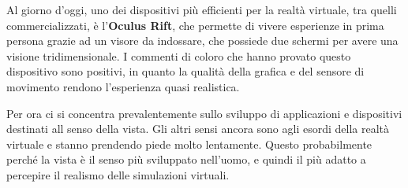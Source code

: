 Al giorno d'oggi, uno dei dispositivi più efficienti per la realtà virtuale, tra quelli commercializzati, è l'\textbf{Oculus Rift}, che permette di vivere esperienze in prima persona grazie ad un visore da indossare, che possiede due schermi per avere una visione tridimensionale.
I commenti di coloro che hanno provato questo dispositivo sono positivi, in quanto la qualità della grafica e del sensore di movimento rendono l'esperienza quasi realistica.

Per ora ci si concentra prevalentemente sullo sviluppo di applicazioni e dispositivi destinati all senso della vista. Gli altri sensi ancora sono agli esordi della realtà virtuale e stanno prendendo piede molto lentamente. Questo probabilmente perché la vista è il senso più sviluppato nell'uomo, e quindi il più adatto a percepire il realismo delle simulazioni virtuali. 






